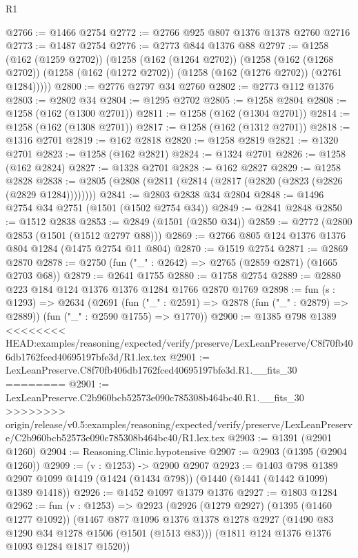 \begin{lexlean}{R1}
\begin{coremodule}
{{{{{{{{{{{{{{{{{{{{{{{{{{{{{{{{{{{{{{{{{{{{{{{{{{{{{{{{{{{{{{{{{{{{{{{{{{{{{{{{{{{{{{{{{{@2766 := @1466 @2754
@2772 := @2766 @925 @807 @1376 @1378 @2760 @2716
@2773 := @1487 @2754
@2776 := @2773 @844 @1376 @88
@2797 := @1258
    (@162 (@1259 @2702))
    (@1258
      (@162 (@1264 @2702))
      (@1258
        (@162 (@1268 @2702))
        (@1258 (@162 (@1272 @2702)) (@1258 (@162 (@1276 @2702)) (@2761 @1284)))))
@2800 := @2776 @2797 @34 @2760
@2802 := @2773 @112 @1376
@2803 := @2802 @34
@2804 := @1295 @2702
@2805 := @1258 @2804
@2808 := @1258 (@162 (@1300 @2701))
@2811 := @1258 (@162 (@1304 @2701))
@2814 := @1258 (@162 (@1308 @2701))
@2817 := @1258 (@162 (@1312 @2701))
@2818 := @1316 @2701
@2819 := @162 @2818
@2820 := @1258 @2819
@2821 := @1320 @2701
@2823 := @1258 (@162 @2821)
@2824 := @1324 @2701
@2826 := @1258 (@162 @2824)
@2827 := @1328 @2701
@2828 := @162 @2827
@2829 := @1258 @2828
@2838 := @2805 (@2808 (@2811 (@2814 (@2817 (@2820 (@2823 (@2826 (@2829 @1284))))))))
@2841 := @2803 @2838 @34 @2804
@2848 := @1496 @2754 @34 @2751 (@1501 (@1502 @2754 @34))
@2849 := @2841 @2848
@2850 := @1512 @2838
@2853 := @2849 (@1501 (@2850 @34))
@2859 := @2772 (@2800 @2853 (@1501 (@1512 @2797 @88)))
@2869 := @2766 @805 @124 @1376 @1376 @804 @1284 (@1475 @2754 @11 @804)
@2870 := @1519 @2754
@2871 := @2869 @2870
@2878 := @2750 (fun ("_" : @2642) => @2765 (@2859 @2871) (@1665 @2703 @68))
@2879 := @2641 @1755
@2880 := @1758 @2754
@2889 := @2880 @223 @184 @124 @1376 @1376 @1284 @1766 @2870 @1769
@2898 := fun (s : @1293) =>
  @2634
    (@2691
      (fun ("_" : @2591) => @2878 (fun ("_" : @2879) => @2889))
      (fun ("_" : @2590 @1755) => @1770))
@2900 := @1385 @798 @1389
<<<<<<<< HEAD:examples/reasoning/expected/verify/preserve/LexLeanPreserve/C8f70fb406db1762fced40695197bfe3d/R1.lex.tex
@2901 := LexLeanPreserve.C8f70fb406db1762fced40695197bfe3d.R1.__fits_30
========
@2901 := LexLeanPreserve.C2b960bcb52573e090c785308b464bc40.R1.__fits_30
>>>>>>>> origin/release/v0.5:examples/reasoning/expected/verify/preserve/LexLeanPreserve/C2b960bcb52573e090c785308b464bc40/R1.lex.tex
@2903 := @1391 (@2901 @1260)
@2904 := Reasoning.Clinic.hypotensive
@2907 := @2903 (@1395 (@2904 @1260))
@2909 := (v : @1253) -> @2900 @2907
@2923 := @1403
    @798
    @1389
    @2907
    @1099
    @1419
    (@1424 (@1434 @798))
    (@1440 (@1441 (@1442 @1099) @1389 @1418))
@2926 := @1452 @1097 @1379 @1376
@2927 := @1803 @1284
@2962 := fun (v : @1253) =>
  @2923
    (@2926
      (@1279 @2927)
      (@1395 (@1460 @1277 @1092))
      (@1467
        @877
        @1096
        @1376
        @1378
        @1278
        @2927
        (@1490 @83 @1290 @34 @1278 @1506 (@1501 (@1513 @83)))
        (@1811 @124 @1376 @1376 @1093 @1284 @1817 @1520))
}}}}}}}}}}}}}}}}}}}}}}}}}}}}}}}}}}}}}}}}}}}}}}}}}}}}}}}}}}}}}}}}}}}}}}}}}}}}}}}}}}}}}}}}}}
\end{coremodule}
\end{lexlean}

